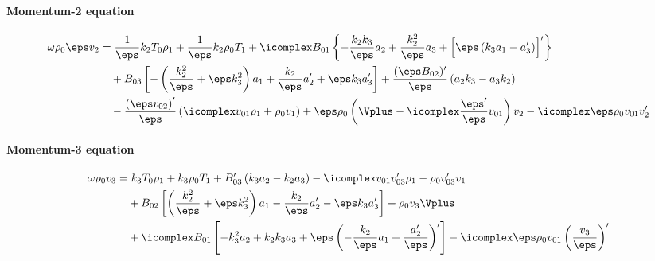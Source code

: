 \paragraph{Momentum-2 equation}
{\customEquationFont
\begin{equation} \label{eq: full_momentum2}
  \begin{aligned}
  \omega\rho_0 \eps v_2 &=
    \frac{1}{\eps} k_2 T_0 \rho_1
    + \frac{1}{\eps}k_2 \rho_0 T_1
    + \icomplex B_{01} \left\{
      -\frac{k_2 k_3}{\eps}a_2  + \frac{k_2^2}{\eps}a_3 + \Bigl[\eps\left(k_3 a_1  - a_3'\right)\Bigr]'
    \right\} \\
    &\quad
    + B_{03} \left[- \left(\frac{k_2^2}{\eps} + \eps k_3^2\right)a_1  + \frac{ k_2}{\eps}a_2' +  \eps k_3a_3'\right]
    + \frac{(\eps B_{02})'}{\eps}\left(a_2 k_3 - a_3 k_2\right) \\
    &\quad
    - \frac{\left(\eps v_{02}\right)'}{\eps} \left(\icomplex v_{01} \rho_1 + \rho_0 v_1\right)
    + \eps\rho_0 \left(\Vplus - \icomplex \frac{\eps'}{\eps} v_{01}\right)v_2
    - \icomplex \eps \rho_0 v_{01} v_2'
  \end{aligned}
\end{equation}
}


\paragraph{Momentum-3 equation}
{\customEquationFont
\begin{equation} \label{eq: full_momentum3}
  \begin{aligned}
    \omega \rho_0 v_3 &=
      k_3 T_0 \rho_1
      + k_3 \rho_0 T_1
		  + B_{03}' \left(k_3 a_2  - k_2 a_3\right)
      - \icomplex v_{01} v_{03}' \rho_1
      - \rho_0 v_{03}'v_1 \\
      &\quad
		  + B_{02} \left[
        \left(\frac{k_2^2}{\eps} + \eps k_3^2\right)a_1  - \frac{k_2}{\eps}a_2'  - \eps k_3 a_3'
      \right]
      + \rho_0 v_3 \Vplus \\
		&\quad
    + \icomplex B_{01} \left[
      -k_3^2 a_2  + k_2 k_3 a_3  + \eps\left(- \frac{k_2}{\eps}a_1 + \frac{a_2'}{\eps}\right)'
    \right]
    - \icomplex \eps \rho_0 v_{01} \left(\frac{v_3}{\eps}\right)'
  \end{aligned}
\end{equation}
}

